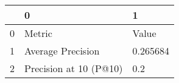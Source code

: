\begin{tabular}{lll}
\toprule
{} &                       0 &         1 \\
\midrule
0 &                  Metric &     Value \\
1 &       Average Precision &  0.265684 \\
2 &  Precision at 10 (P@10) &       0.2 \\
\bottomrule
\end{tabular}
